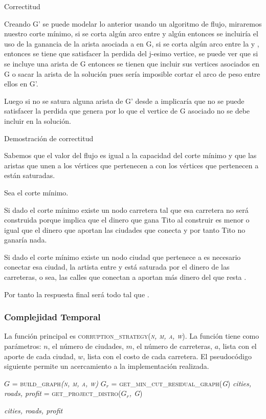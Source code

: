\documentclass[10pt]{article} %
\begin{document}
	Correctitud

	Creando G' se puede modelar lo anterior usando un algoritmo de flujo, miraremos nuestro corte mínimo, si se corta algún arco entre 
	y algún 
	entonces se incluiría el uso de la ganancia de la arista asociada a 
	en G, si se corta algún arco entre la 
	y 
	, entonces se tiene que satisfacer la perdida del j-esimo vertice, se puede ver que si se incluye una arista de G entonces se tienen que incluir sus vertices asociados en G o sacar la arista de la solución pues sería imposible cortar el arco de peso 
	entre ellos en G'.
	
	Luego si no se satura alguna arista de G' desde 
	a 
	implicaría que no se puede satisfacer la perdida que genera por lo que el vertice de G asociado 
	no se debe incluir en la solución.
	
	Demostración de correctitud
	
	Sabemos que el valor del flujo es igual a la capacidad del corte mínimo y que las aristas que unen a los vértices que pertenecen a 
	con los vértices que pertenecen a 
	están saturadas.
	
	Sea 
	el corte mínimo.
	
	Si dado el corte mínimo existe un nodo carretera 
	tal que 
	esa carretera no será construida porque implica que el dinero que gana Tito al construir 
	es menor o igual que el dinero que aportan las ciudades que conecta y por tanto Tito no ganaría nada.
	
	Si dado el corte mínimo existe un nodo ciudad 
	que pertenece a 
	es necesario conectar esa ciudad, la artista entre 
	y 
	está saturada por el dinero de las carreteras, o sea, las calles que conectan a 
	aportan más dinero del que resta 
	.
	
	Por tanto la respuesta final será todo 
	tal que 
	.
	
	\subsubsection{Complejidad Temporal}
	
	La funci\'on principal es \textsc{corruption\_strategy(\textit{n, m, a, w})}. La funci\'on tiene como par\'ametros: $n$, el n\'umero de ciudades, $m$, el n\'umero de carreteras, $a$, lista con el aporte de cada ciudad, $w$, lista con el costo de cada carretera. El pseudoc\'odigo siguiente permite un acercamiento a la implementaci\'on realizada.
	
	\begin{algorithmic}[1]
		
		\State $G$ = \textsc{build\_graph\textit{(n, m, a, w)}}
		\State $G_r$ =\textsc{ get\_min\_cut\_residual\_graph(\textit{G})}
		\State \textit{cities, roads, profit} = \textsc{get\_project\_distro(\textit{$G_r$, G})}
		
		\Return \textit{cities, roads, profit}
		\EndFunction
	\end{algorithmic}
\end{document}
